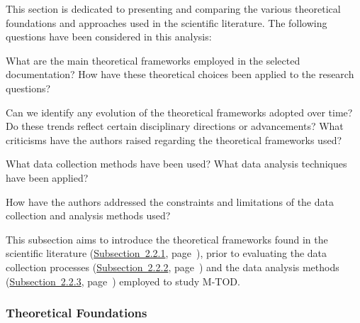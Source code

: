 \begin{refsegment}
This section is dedicated to presenting and comparing the various theoretical foundations and approaches used in the scientific literature. The following questions have been considered in this analysis:
    \begin{customitemize}
        \item What are the main theoretical frameworks employed in the selected documentation? How have these theoretical choices been applied to the research questions?
        \item Can we identify any evolution of the theoretical frameworks adopted over time? Do these trends reflect certain disciplinary directions or advancements? What criticisms have the authors raised regarding the theoretical frameworks used?
        \item What data collection methods have been used? What data analysis techniques have been applied?
        \item How have the authors addressed the constraints and limitations of the data collection and analysis methods used?
    \end{customitemize}%

This subsection aims to introduce the theoretical frameworks found in the scientific literature (\hyperref[chap2:fondements-theoriques]{Subsection~2.2.1}, page~\pageref{chap2:fondements-theoriques}), prior to evaluating the data collection processes (\hyperref[chap2:methodes-collecte-donnees]{Subsection~2.2.2}, page~\pageref{chap2:methodes-collecte-donnees}) and the data analysis methods (\hyperref[chap2:demarches-types-analyses]{Subsection~2.2.3}, page~\pageref{chap2:demarches-types-analyses}) employed to study \acrshort{M-TOD}.%

\subsubsection*{Theoretical Foundations
    \label{chap2:fondements-theoriques}
    }


\end{refsegment}
